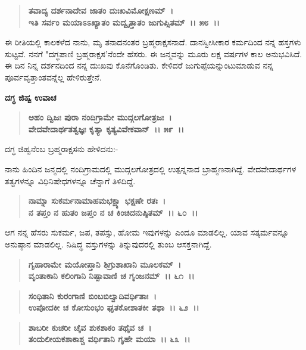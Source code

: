 \begin{verse}
\textbf{ತವಾದ್ಯ ದರ್ಶನಾದೇವ ಜಾತಂ ದುಃಖವಿಮೋಕ್ಷಣಮ್~।}\\\textbf{ಇತಿ ಸರ್ವಂ ಮಯಾಽಽಖ್ಯಾತಂ ಮದ್ವೃತ್ತಾತಂ ಜುಗುಪ್ಸಿತಮ್~।। ೫೮~।।}
\end{verse}

ಈ ರೀತಿಯಲ್ಲಿ ಕಾಲಕಳೆದ ನಾನು, ಮೃ ತನಾದನಂತರ ಬ್ರಹ್ಮರಾಕ್ಷಸನಾದೆ. ದಾನಸ್ವೀಸೀಕಾರ ಕರ್ಮದಿಂದ ನನ್ನ ಹಸ್ತಗಳು ಸುಟ್ಟವೆ. ನನಗೆ "ದಗ್ಧಪಾಣಿ ಬ್ರಹ್ಮರಾಕ್ಷಸ'ನೆಂದೇ ಹೆಸರು. ಈ ಜನ್ಮವನ್ನು ಮೂರು ಲಕ್ಷ ವರ್ಷಗಳ ಕಾಲ ಅನುಭವಿಸಿದೆ. ಈ ದಿನ ನಿನ್ನ ದರ್ಶನದಿಂದ ನನ್ನ ದುಃಖವು ಕೊನೆಗೊಂಡಿತು. ಕೇಳಿದರೆ ಜುಗುಪ್ಪೆಯನ್ನುಂಟುಮಾಡುವ ನನ್ನ ಪೂರ್ವವೃತ್ತಾಂತವನ್ನೆಲ್ಲ ಹೇಳಿರುತ್ತೇನೆ.

\begin{flushleft}
\textbf{ದಗ್ಧ ಜಿಹ್ವ ಉವಾಚ\enginline{-}}
\end{flushleft}

\begin{verse}
\textbf{ಅಹಂ ದ್ವಿಜಃ ಪುರಾ ನಂದಿಗ್ರಾಮೇ ಮುದ್ಗಲಗೋತ್ರಜಃ~।}\\\textbf{ವೇದವೇದಾರ್ಥತತ್ವಜ್ಞಃ ಕೃತ್ಯಾ ಕೃತ್ಯವಿವೇಕವಾನ್~।। ೫೯~।।}
\end{verse}

\begin{flushleft}
ದಗ್ಧ ಜಿಹ್ವನೆಂಬ ಬ್ರಹ್ಮರಾಕ್ಷಸನು ಹೇಳಿದನು:-
\end{flushleft}

ನಾನು ಹಿಂದಿನ ಜನ್ಮದಲ್ಲಿ ನಂದಿಗ್ರಾಮದಲ್ಲಿ ಮುದ್ಗಲಗೋತ್ರದಲ್ಲಿ ಉತ್ಪನ್ನನಾದ ಬ್ರಾಹ್ಮಣನಾಗಿದ್ದೆ. ವೇದವೇದಾರ್ಥಗಳ ತತ್ವಗಳನ್ನೂ ವಿಧಿನಿಷೇಧಗಳನ್ನೂ ಚೆನ್ನಾಗೆ ತಿಳಿದಿದ್ದೆ.

\begin{verse}
\textbf{ನಾಮ್ನಾ ಸುಕರ್ಮನಾಮಾಹಮಭಕ್ಷ್ಯಾ ಭಕ್ಷಣೇ ರತಃ~।}\\\textbf{ನ ತಪ್ತಂ ನ ಹುತಂ ಜಪ್ತಂ ನ ಚ ಕಿಂಚಿದನುಷ್ಠಿತಮ್~।। ೬೦~।।}
\end{verse}

ಆಗ ನನ್ನ ಹೆಸರು ಸುಕರ್ಮ, ಜಪ, ತಪಸ್ಸು, ಹೋಮ ಇವುಗಳನ್ನು ಎಂದೂ ಮಾಡಲಿಲ್ಲ. ಯಾವ ಸತ್ಕರ್ಮವನ್ನೂ ಅನುಷ್ಠಾನ ಮಾಡಲಿಲ್ಲ. ನಿಷಿದ್ಧ ವಸ್ತುಗಳನ್ನು ತಿನ್ನುವುದರಲ್ಲಿ ತುಂಬ ಆಸಕ್ತನಾಗಿದ್ದೆ.

\begin{verse}
\textbf{ಗೃಹಾರಾಮೇ ಮಯೋಪ್ತಾನಿ ಶಿಗ್ರುಶಾಖಾನಿ ಮೂಲಕಮ್~।}\\\textbf{ವೃಂತಾಕಾನಿ ಕಲಿಂಗಾನಿ ನಿಷ್ಪಾವಾಣಿ ಚ ಗೃಂಜನಮ್~।। ೬೧~।।} 
\end{verse}

\begin{verse}
\textbf{ಸಂಧಿತಾನಿ ಕುರಂಗಾಣಿ ಬಿಂಬಬಿಲ್ವಾದಿವರ್ಧಿತಾಃ~।}\\\textbf{ಉಪೋದಕೀ ಚ ಕೋಸುಂಭಂ ಘೃತಕೋಶಾತಕೀ ತಥಾ~।। ೬೨~।।}
\end{verse}

\begin{verse}
\textbf{ಶಾಬರೀ ಕುಚರೀ ಚೈವ ಶುಕಶಾಕಂ ತಥೈವ ಚ~।}\\\textbf{ತಂದುಲೀಯಕಶಾಕಾಶ್ಚ ವರ್ಧಿತಾನಿ ಗೃಹೇ ಮಯಾ~।। ೬೩~।।}
\end{verse}

